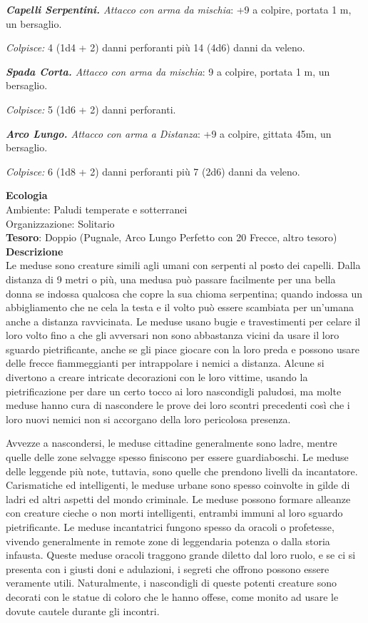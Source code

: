 \begin{multicols}{2}
\textit{\textbf{Capelli Serpentini.} Attacco con arma da mischia}: +9 a colpire, portata 1 m, un bersaglio.

\textit{Colpisce:} 4 (1d4 + 2) danni perforanti più 14 (4d6) danni da veleno.

\textit{\textbf{Spada Corta.} Attacco con arma da mischia}: 9 a colpire, portata 1 m, un bersaglio.

\textit{Colpisce:} 5 (1d6 + 2) danni perforanti.

\textit{\textbf{Arco Lungo.} Attacco con arma a Distanza}: +9 a colpire, gittata 45m, un bersaglio.

\textit{Colpisce:} 6 (1d8 + 2) danni perforanti più 7 (2d6) danni da veleno.

\textbf{Ecologia}\\
Ambiente: Paludi temperate e sotterranei\\
Organizzazione: Solitario\\
\textbf{Tesoro}: Doppio (Pugnale, Arco Lungo Perfetto con 20 Frecce, altro tesoro)\\
\textbf{Descrizione}\\
Le meduse sono creature simili agli umani con serpenti al posto dei capelli. Dalla distanza di 9 metri o più, una medusa può passare facilmente per una bella donna se indossa qualcosa che copre la sua chioma serpentina; quando indossa un abbigliamento che ne cela la testa e il volto può essere scambiata per un'umana anche a distanza ravvicinata. Le meduse usano bugie e travestimenti per celare il loro volto fino a che gli avversari non sono abbastanza vicini da usare il loro sguardo pietrificante, anche se gli piace giocare con la loro preda e possono usare delle frecce fiammeggianti per intrappolare i nemici a distanza. Alcune si divertono a creare intricate decorazioni con le loro vittime, usando la pietrificazione per dare un certo tocco ai loro nascondigli paludosi, ma molte meduse hanno cura di nascondere le prove dei loro scontri precedenti così che i loro nuovi nemici non si accorgano della loro pericolosa presenza.

Avvezze a nascondersi, le meduse cittadine generalmente sono ladre, mentre quelle delle zone selvagge spesso finiscono per essere guardiaboschi. Le meduse delle leggende più note, tuttavia, sono quelle che prendono livelli da incantatore. Carismatiche ed intelligenti, le meduse urbane sono spesso coinvolte in gilde di ladri ed altri aspetti del mondo criminale. Le meduse possono formare alleanze con creature cieche o non morti intelligenti, entrambi immuni al loro sguardo pietrificante. Le meduse incantatrici fungono spesso da oracoli o profetesse, vivendo generalmente in remote zone di leggendaria potenza o dalla storia infausta. Queste meduse oracoli traggono grande diletto dal loro ruolo, e se ci si presenta con i giusti doni e adulazioni, i segreti che offrono possono essere veramente utili. Naturalmente, i nascondigli di queste potenti creature sono decorati con le statue di coloro che le hanno offese, come monito ad usare le dovute cautele durante gli incontri.


\end{multicols}
